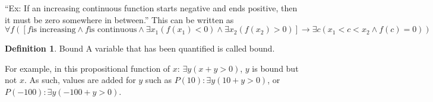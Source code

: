 \documentclass{article}
\theoremstyle{definition}
\newtheorem{definition}{Definition}[section]
\begin{document}
``Ex: If an increasing continuous function starts negative and ends positive,
then it must be zero somewhere in between.'' This can be written as
$\forall f ([ f \text{is increasing} \land f \text{is continuous} \land
\exists x_1 (f(x_1) < 0) \land \exists x_2 (f(x_2) > 0)] \rightarrow
\exists c (x_1 < c < x_2 \land f(c) = 0))$

\begin{definition}{Bound}
  A variable that has been quantified is called bound.
\end{definition}

For example, in this propositional function of $x$: $\exists y (x + y > 0)$, $y$ is bound but not $x$. As such, values are added for $y$ such as $P(10): \exists y (10+y > 0)$, or $P(-100): \exists y (-100 + y > 0)$. 
\end{document}
